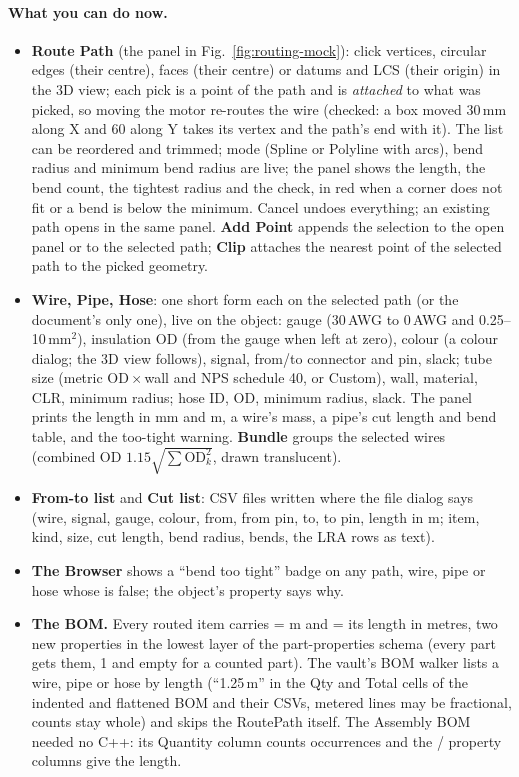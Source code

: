 \paragraph{What you can do now.}
\begin{itemize}[nosep]
  \item \textbf{Route Path} (the panel in Fig.~\ref{fig:routing-mock}): click vertices, circular edges (their centre),
        faces (their centre) or datums and LCS (their origin) in the 3D view; each pick is a point of the path and
        is \emph{attached} to what was picked, so moving the motor re-routes the wire (checked: a box moved 30\,mm
        along X and 60 along Y takes its vertex and the path's end with it). The list can be reordered and
        trimmed; mode (Spline or Polyline with arcs), bend radius and minimum bend radius are live; the panel shows
        the length, the bend count, the tightest radius and the check, in red when a corner does not fit or a bend
        is below the minimum. Cancel undoes everything; an existing path opens in the same panel. \textbf{Add
        Point} appends the selection to the open panel or to the selected path; \textbf{Clip} attaches the nearest
        point of the selected path to the picked geometry.
  \item \textbf{Wire, Pipe, Hose}: one short form each on the selected path (or the document's only one), live on
        the object: gauge (30\,AWG to 0\,AWG and 0.25--10\,mm$^2$), insulation OD (from the gauge when left at
        zero), colour (a colour dialog; the 3D view follows), signal, from/to connector and pin, slack; tube size
        (metric OD\,$\times$\,wall and NPS schedule 40, or Custom), wall, material, CLR, minimum radius; hose ID,
        OD, minimum radius, slack. The panel prints the length in mm and m, a wire's mass, a pipe's cut length and
        bend table, and the too-tight warning. \textbf{Bundle} groups the selected wires (combined OD
        $1.15\sqrt{\sum\text{OD}_k^2}$, drawn translucent).
  \item \textbf{From-to list} and \textbf{Cut list}: CSV files written where the file dialog says (wire, signal,
        gauge, colour, from, from pin, to, to pin, length in m; item, kind, size, cut length, bend radius, bends,
        the LRA rows as text).
  \item \textbf{The Browser} shows a ``bend too tight'' badge on any path, wire, pipe or hose whose 
        is false; the object's  property says why.
  \item \textbf{The BOM.} Every routed item carries  = m and  = its length in
        metres, two new properties in the lowest layer of the part-properties schema (every part gets them, 1 and
        empty for a counted part). The vault's BOM walker lists a wire, pipe or hose by length (``1.25\,m'' in
        the Qty and Total cells of the indented and flattened BOM and their CSVs, metered lines may be fractional,
        counts stay whole) and skips the RoutePath itself. The Assembly BOM needed no C++: its Quantity column
        counts occurrences and the  /  property columns give the length.
\end{itemize}

